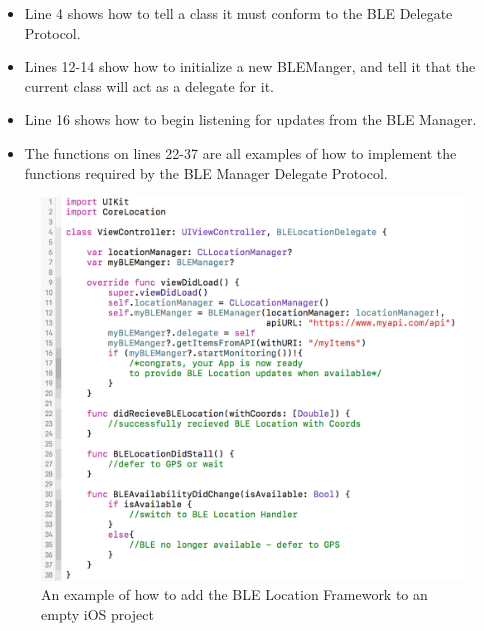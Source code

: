 \begin{itemize}
\item Line 4 shows how to tell a class it must conform to the BLE Delegate Protocol.
\item Lines 12-14 show how to initialize a new BLEManger, and tell it that the current class will act as a delegate for it.
\item Line 16 shows how to begin listening for updates from the BLE Manager.
\item The functions on lines 22-37 are all examples of how to implement the functions required by the BLE Manager Delegate Protocol.
\end{itemize}

\begin{figure}[h]
\includegraphics[width=1\textwidth]{images/code.png}
\caption{An example of how to add the BLE Location Framework to an empty iOS project}
\end{figure}
